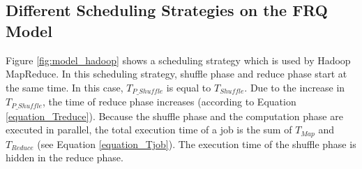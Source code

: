 {\subsection{Different Scheduling Strategies on the FRQ Model}\label{model_analysis}




Figure \ref{fig:model_hadoop} shows a scheduling strategy which is used by Hadoop MapReduce. In this scheduling strategy, shuffle phase and reduce phase start at the same time. In this case, \(T_{P\_Shuffle}\) is equal to \(T_{Shuffle}\). Due to the increase in \(T_{P\_Shuffle}\), the time of reduce phase increases (according to Equation \ref{equation_Treduce}). Because the shuffle phase and the computation phase are executed in parallel, the total execution time of a job is the sum of \(T_{Map}\) and \(T_{Reduce}\) (see Equation \ref{equation_Tjob}). The execution time of the shuffle phase is hidden in the reduce phase. 

}
